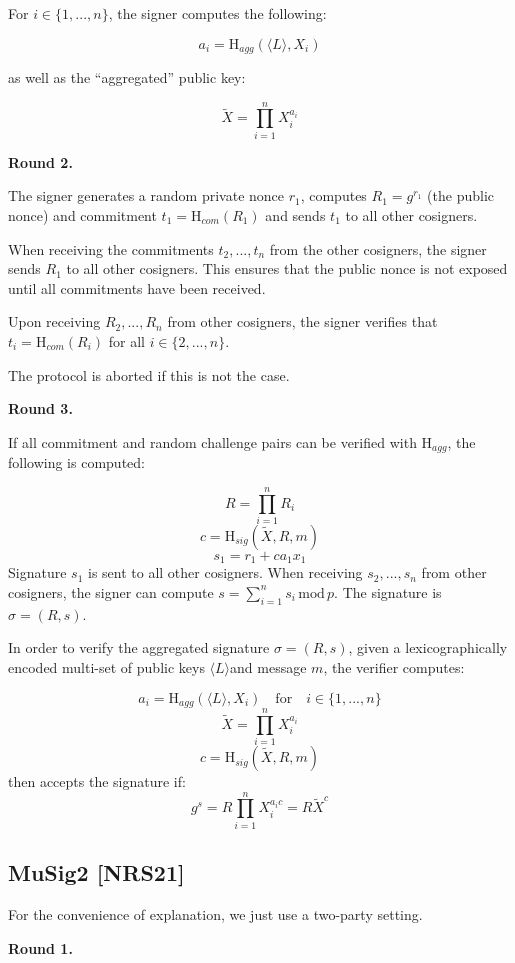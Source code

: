 \documentclass{article}
\begin{document}
For $i \in \{1,...,n\}$, the signer computes the following:

\[
a_i = \textrm{H}_{agg}(\langle L \rangle, X_i)
\]

as well as the “aggregated” public key:

\[
\tilde X = \prod_{i=1}^{n} X_i^{a_i}
\]


\textbf{Round 2.}

The signer generates a random private nonce $r_1$, computes $R_1 = g^{r_1}$ (the public nonce) and commitment $ t_{1} = \textrm{H}_{com}(R_{1}) $ and sends $t_{1}$ to all other cosigners.

When receiving the commitments $t_2,...,t_n$ from the other cosigners, the signer sends $R_1$ to all other cosigners. This ensures that the public nonce is not exposed until all commitments have been received.


Upon receiving $R_2,...,R_n$ from other cosigners, the signer verifies that $ t_{i} = \textrm{H}_{com}(R_{i}) $ for all $i \in \{2,...,n\}$.

The protocol is aborted if this is not the case.


\textbf{Round 3.}

If all commitment and random challenge pairs can be verified with $\textrm{H}_{agg}$, the following is computed:

\[
R = \prod_{i=1}^{n} R_i
\]
\[
c = \textrm{H}_{sig}(\tilde{X},R,m)
\]
\[
s_1 = r_1 + ca_1x_1
\]
Signature $s_1$ is sent to all other cosigners. When receiving $s_2,...,s_n$ from other cosigners, the signer can compute $s = \sum_{i=1}^{n}s_i \, \textrm{mod} \, p$. The signature is $\sigma=(R,s)$.

In order to verify the aggregated signature $\sigma=(R,s)$, given a lexicographically encoded multi-set of public keys $\langle L \rangle$and message $m$, the verifier computes:

\[
a_i = \textrm{H}_{agg}(\langle L \rangle, X_i)\quad \textrm{for} \quad i \in \{1,...,n\}
\]
\[
\tilde X = \prod_{i=1}^{n} X_i^{a_i}
\]
\[
c = \textrm{H}_{sig}(\tilde{X},R,m)
\]
then accepts the signature if:
\[
g^s = R \prod_{i=1}^{n}X_i^{a_ic} = R\tilde X^c
\]


\subsection{MuSig2 [NRS21]}

For the convenience of explanation, we just use a two-party setting.

\textbf{Round 1.}
\end{document}

